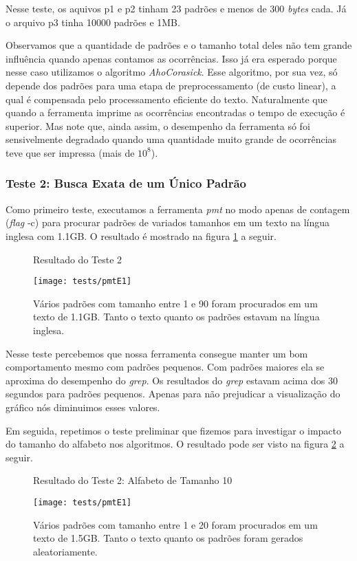 \documentclass[]{article}
\newcommand{\figref}[1]{figura \ref{#1}}
\begin{document}
Nesse teste, os aquivos p1 e p2 tinham 23 padrões e menos de 300 \textit{bytes} cada. Já o arquivo p3 tinha 10000 padrões e 1MB.

Observamos que a quantidade de padrões e o tamanho total deles não tem grande influência quando apenas contamos as ocorrências. Isso já era esperado porque nesse caso utilizamos o algoritmo \textit{AhoCorasick}. Esse algoritmo, por sua vez, só depende dos padrões para uma etapa de preprocessamento (de custo linear), a qual é compensada pelo processamento eficiente do texto. Naturalmente que quando a ferramenta imprime as ocorrências encontradas o tempo de execução é superior. Mas note que, ainda assim, o desempenho da ferramenta só foi sensivelmente degradado quando uma quantidade muito grande de ocorrências teve que ser impressa (mais de $10^8$).

\subsubsection{Teste 2: Busca Exata de um Único Padrão}

Como primeiro teste, executamos a ferramenta \textit{pmt} no modo apenas de contagem (\textit{flag} -c) para procurar padrões de variados tamanhos em um texto na língua inglesa com 1.1GB. O resultado é mostrado na \figref{fig:pmtE1} a seguir.

\begin{figure}[h]
	{\centering Resultado do Teste 2\par}
	\texttt{[image: tests/pmtE1]}
\caption{Vários padrões com tamanho entre 1 e 90 foram procurados em um texto de 1.1GB. Tanto o texto quanto os padrões estavam na língua inglesa.}
\label{fig:pmtE1}
\end{figure}

Nesse teste percebemos que nossa ferramenta consegue manter um bom comportamento mesmo com padrões pequenos. Com padrões maiores ela se aproxima do desempenho do \textit{grep}. Os resultados do \textit{grep} estavam acima dos 30 segundos para padrões pequenos. Apenas para não prejudicar a visualização do gráfico nós diminuimos esses valores.

Em seguida, repetimos o teste preliminar que fizemos para investigar o impacto do tamanho do alfabeto nos algoritmos. O resultado pode ser visto na \figref{fig:pmtE2} a seguir.

\begin{figure}[h]
	{\centering Resultado do Teste 2: Alfabeto de Tamanho 10\par}
	\texttt{[image: tests/pmtE1]}
\caption{Vários padrões com tamanho entre 1 e 20 foram procurados em um texto de 1.5GB. Tanto o texto quanto os padrões foram gerados aleatoriamente.}
\label{fig:pmtE2}
\end{figure}
\end{document}
